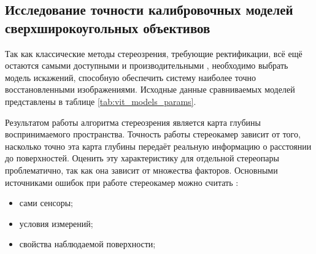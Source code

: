 \subsection{Исследование точности калибровочных моделей сверхширокоугольных объективов}

Так как классические методы стереозрения, требующие ректификации, всё ещё остаются самыми доступными и производительными \cite{disparity_review}, 
необходимо выбрать модель искажений, способную обеспечить систему наиболее точно восстановленными изображениями. 
Исходные данные сравниваемых моделей представлены в таблице \ref{tab:vit_models_params}.

\begin{table}[h!]
    
    \caption{Результаты калибровки}
    \label{tab:vit_models_params}
\end{table}

Результатом работы алгоритма стереозрения является карта глубины воспринимаемого пространства.  Точность работы 
стереокамер зависит от того, насколько точно эта карта глубины передаёт реальную информацию о расстоянии до поверхностей.
Оценить эту характеристику для отдельной стереопары проблематично, так как она зависит от множества факторов. Основными источниками
 ошибок при работе стереокамер можно считать \cite{kinect_perf}: 
\begin{itemize}
    \item сами сенсоры;
    \item условия измерений;
    \item свойства наблюдаемой поверхности;
\end{itemize}

